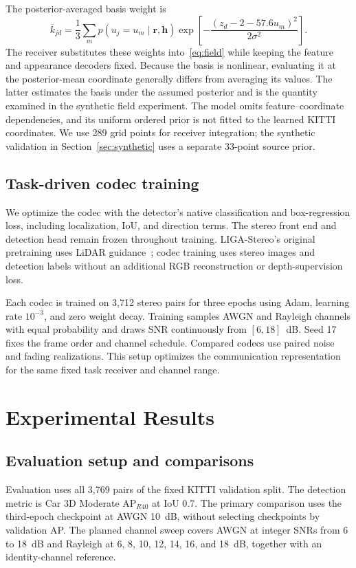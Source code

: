 \documentclass[conference]{IEEEtran}
\begin{document}
The posterior-averaged basis weight is
\begin{equation}
 \overline k_{jd}=\frac{1}{3}\sum_m p(u_j=u_m\mid\mathbf r,\mathbf h)
 \exp\!\left[-\frac{(z_d-2-57.6u_m)^2}{2\sigma^2}\right].
 \label{eq:expectedbasis}
\end{equation}
The receiver substitutes these weights into~\eqref{eq:field} while keeping
the feature and appearance decoders fixed. Because the basis is nonlinear,
evaluating it at the posterior-mean coordinate generally differs from
averaging its values. The latter estimates the basis under the assumed
posterior and is the quantity examined in the synthetic field experiment.
The model omits feature--coordinate dependencies, and its uniform ordered
prior is not fitted to the learned KITTI coordinates. We use 289 grid
points for receiver integration; the synthetic validation in
Section~\ref{sec:synthetic} uses a separate 33-point source prior.

\subsection{Task-driven codec training}
We optimize the codec with the detector's native classification and
box-regression loss, including localization, IoU, and direction terms.
The stereo front end and detection head remain frozen throughout training.
LIGA-Stereo's original pretraining uses LiDAR guidance~\cite{liga}; codec
training uses stereo images and detection labels without an additional
RGB reconstruction or depth-supervision loss.

Each codec is trained on 3,712 stereo pairs for three epochs using Adam,
learning rate $10^{-3}$, and zero weight decay. Training samples AWGN and
Rayleigh channels with equal probability and draws SNR continuously from
$[6,18]$~dB. Seed 17 fixes the frame order and channel schedule. Compared
codecs use paired noise and fading realizations. This setup optimizes the
communication representation for the same fixed task receiver and channel
range.

\section{Experimental Results}
\label{sec:evaluation}
\subsection{Evaluation setup and comparisons}
Evaluation uses all 3,769 pairs of the fixed KITTI validation split. The
detection metric is Car 3D Moderate AP$_{R40}$ at IoU 0.7. The primary
comparison uses the third-epoch checkpoint at AWGN 10~dB, without selecting
checkpoints by validation AP. The planned channel sweep covers AWGN at
integer SNRs from 6 to 18~dB and Rayleigh at 6, 8, 10, 12, 14, 16, and
18~dB, together with an identity-channel reference.
\end{document}

